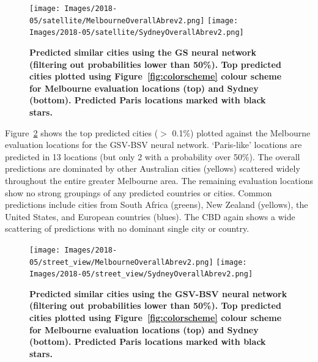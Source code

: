 \documentclass[Crown,sageh,times]{sagej}
\begin{document}

\begin{figure}[!htbp]
\centering   
\texttt{[image: Images/2018-05/satellite/MelbourneOverallAbrev2.png]} 
\texttt{[image: Images/2018-05/satellite/SydneyOverallAbrev2.png]}  
\caption{ \bf Predicted similar cities using the GS neural network (filtering out probabilities lower than 50\%). Top predicted cities plotted using Figure~\ref{fig:colorscheme} colour scheme for Melbourne evaluation locations (top) and Sydney (bottom). Predicted Paris locations marked with black stars.}    
 \label{fig:melsat}  
\end{figure} 

Figure~\ref{fig:melstreet} shows the top predicted cities ($>$ 0.1\%) plotted against the Melbourne evaluation locations for the GSV-BSV neural network. `Paris-like' locations are predicted in 13 locations (but only 2 with a probability over 50\%). The overall predictions are dominated by other Australian cities (yellows) scattered widely throughout the entire greater Melbourne area. The remaining evaluation locations show no strong groupings of any predicted countries or cities. Common predictions include cities from South Africa (greens), New Zealand (yellows), the United States, and European countries (blues). The CBD again shows a wide scattering of predictions with no dominant single city or country.





\begin{figure}[!htbp]
\centering   
\texttt{[image: Images/2018-05/street\_view/MelbourneOverallAbrev2.png]} 
\texttt{[image: Images/2018-05/street\_view/SydneyOverallAbrev2.png]}  
\caption{ \bf Predicted similar cities using the GSV-BSV neural network (filtering out probabilities lower than 50\%). Top predicted cities plotted using Figure~\ref{fig:colorscheme} colour scheme for Melbourne evaluation locations (top) and Sydney (bottom). Predicted Paris locations marked with black stars.}    
 \label{fig:melstreet}  
\end{figure} 
\end{document}
